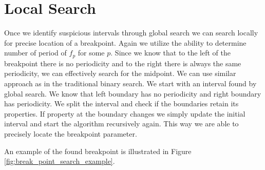 

\section{Local Search}
Once we identify suspicious intervals through global search we can search locally for precise location of a breakpoint.
Again we utilize the ability to determine number of period of $f_p$ for some $p$.
Since we know that to the left of the breakpoint there is no periodicity and to the right there is always the same periodicity, we can effectively search for the midpoint.
We can use similar approach as in the traditional binary search.
We start with an interval found by global search.
We know that left boundary has no periodicity and right boundary has periodicity.
We split the interval and check if the boundaries retain its properties.
If property at the boundary changes we simply update the initial interval and start the algorithm recursively again.
This way we are able to precisely locate the breakpoint parameter.
\par
An example of the found breakpoint is illustrated in Figure \ref{fig:break_point_search_example}.


